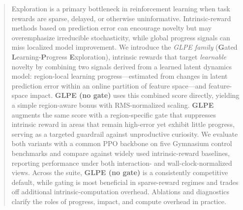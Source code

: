 \begin{abstract}
Exploration is a primary bottleneck in reinforcement learning when task rewards are sparse, delayed, or otherwise uninformative.
Intrinsic-reward methods based on prediction error can encourage novelty but may overemphasize irreducible stochasticity, while global progress signals can miss localized model improvement.
We introduce the \emph{GLPE family} (\textbf{G}ated \textbf{L}earning-\textbf{P}rogress \textbf{E}xploration), intrinsic rewards that target \emph{learnable} novelty by combining two signals derived from a learned latent dynamics model: region-local learning progress---estimated from changes in latent prediction error within an online partition of feature space---and feature-space impact.
\textbf{GLPE (no gate)} uses this combined score directly, yielding a simple region-aware bonus with RMS-normalized scaling.
\textbf{GLPE} augments the same score with a region-specific gate that suppresses intrinsic reward in areas that remain high-error yet exhibit little progress, serving as a targeted guardrail against unproductive curiosity.
We evaluate both variants with a common PPO backbone on five Gymnasium control benchmarks and compare against widely used intrinsic-reward baselines, reporting performance under both interaction- and wall-clock-normalized views.
Across the suite, \textbf{GLPE (no gate)} is a consistently competitive default, while gating is most beneficial in sparse-reward regimes and trades off additional intrinsic-computation overhead.
Ablations and diagnostics clarify the roles of progress, impact, and compute overhead in practice.
\end{abstract}
